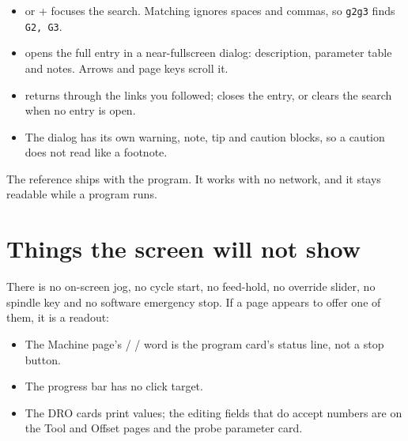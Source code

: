 \begin{itemize}
  \item \keycap{/} or + focuses the search. Matching ignores spaces and
        commas, so \texttt{g2g3} finds \texttt{G2, G3}.
  \item {} opens the full entry in a near-fullscreen dialog: description,
        parameter table and notes. Arrows and page keys scroll it.
  \item {} returns through the links you followed;  closes the
        entry, or clears the search when no entry is open.
  \item The dialog has its own warning, note, tip and caution blocks, so a caution does not
        read like a footnote.
\end{itemize}

The reference ships with the program. It works with no network, and it stays readable while a
program runs.

\section{Things the screen will not show}

There is no on-screen jog, no cycle start, no feed-hold, no override slider, no spindle key
and no software emergency stop. If a page appears to offer one of them, it is a readout:

\begin{itemize}
  \item The Machine page's  /  /  word is the
        program card's status line, not a stop button.
  \item The progress bar has no click target.
  \item The DRO cards print values; the editing fields that do accept numbers are on the
        Tool and Offset pages and the probe parameter card.
\end{itemize}
